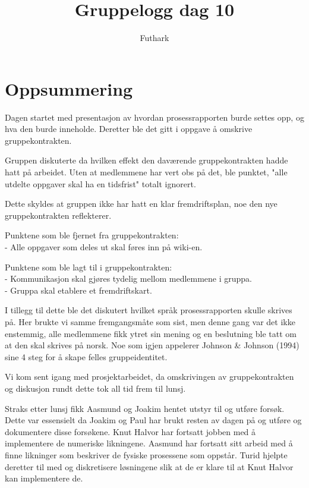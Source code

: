 \documentclass[11pt]{article}
\author{Futhark}
\title{Gruppelogg dag 10}
\begin{document}
\maketitle

\section{Oppsummering}

Dagen startet med presentasjon av hvordan prosessrapporten burde settes opp, og
hva den burde inneholde. Deretter ble det gitt i oppgave å omskrive gruppekontrakten.

Gruppen diskuterte da hvilken effekt den daværende gruppekontrakten hadde hatt på arbeidet.
Uten at medlemmene har vert obs på det, ble punktet, "alle utdelte oppgaver skal ha en tidsfrist" totalt ignorert.

Dette skyldes at gruppen ikke har hatt en klar fremdriftsplan, noe den nye gruppekontrakten
reflekterer.

Punktene som ble fjernet fra gruppekontrakten:\\
- Alle oppgaver som deles ut skal føres inn på wiki-en.

Punktene som ble lagt til i gruppekontrakten:\\
- Kommunikasjon skal gjøres tydelig mellom medlemmene i gruppa.\\
- Gruppa skal etablere et fremdriftskart.

I tillegg til dette ble det diskutert hvilket språk prosessrapporten skulle skrives på. Her
brukte vi samme fremgangsmåte som sist, men denne gang var det ikke enstemmig, 
alle medlemmene fikk ytret sin mening og en beslutning ble
tatt om at den skal skrives på norsk. Noe som igjen appelerer Johnson \& Johnson (1994) sine 4 steg
for å skape felles gruppeidentitet.

Vi kom sent igang med prosjektarbeidet, da omskrivingen av gruppekontrakten og diskusjon
rundt dette tok all tid frem til lunsj.

Straks etter lunsj fikk Aasmund og Joakim hentet utstyr til og utføre forsøk.
Dette var essensielt da Joakim og Paul har brukt resten av dagen på og utføre og dokumentere
disse forsøkene.
Knut Halvor har fortsatt jobben med å implementere de numeriske likningene.
Aasmund har fortsatt sitt arbeid med å finne likninger som beskriver de fysiske prosessene
som oppstår. Turid hjelpte deretter til med og diskretisere løsningene slik at de er klare til
at Knut Halvor kan implementere de.
\end{document}
